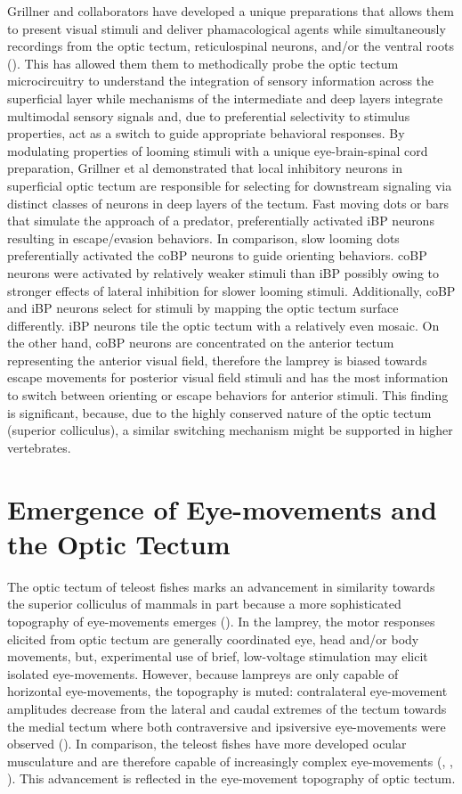 \documentclass{ar-1col}
\begin{document}
Grillner and collaborators have developed a unique preparations that allows them to present visual stimuli and deliver phamacological agents while simultaneously recordings from the optic tectum, reticulospinal neurons, and/or the ventral roots (\cite{kardamakis2015tectal}). This has allowed them them to methodically probe the optic tectum microcircuitry to understand the integration of sensory information across the superficial layer while mechanisms of the intermediate and deep layers integrate multimodal sensory signals and, due to preferential selectivity to stimulus properties, act as a switch to guide appropriate behavioral responses. By modulating properties of looming stimuli with a unique eye-brain-spinal cord preparation, Grillner et al demonstrated that local inhibitory neurons in superficial optic tectum are responsible for selecting for downstream signaling via distinct classes of neurons in deep layers of the tectum. Fast moving dots or bars that simulate the approach of a predator, preferentially activated iBP neurons resulting in escape/evasion behaviors. In comparison, slow looming dots preferentially activated the coBP neurons to guide orienting behaviors. coBP neurons were activated by relatively weaker stimuli than iBP possibly owing to stronger effects of lateral inhibition for slower looming stimuli. Additionally, coBP and iBP neurons select for stimuli by mapping the optic tectum surface differently. iBP neurons tile the optic tectum with a relatively even mosaic. On the other hand, coBP neurons are concentrated on the anterior tectum representing the anterior visual field, therefore the lamprey is biased towards escape movements for posterior visual field stimuli and has the most information to switch between orienting or escape behaviors for anterior stimuli. This finding is significant, because, due to the highly conserved nature of the optic tectum (superior colliculus), a similar switching mechanism might be supported in higher vertebrates.

\section{Emergence of Eye-movements and the Optic Tectum}
The optic tectum of teleost fishes marks an advancement in similarity towards the superior colliculus of mammals in part because a more sophisticated topography of eye-movements emerges (\cite{land2015eye}). In the lamprey, the motor responses elicited from optic tectum are generally coordinated eye, head and/or body movements, but, experimental use of brief, low-voltage stimulation may elicit isolated eye-movements. However, because lampreys are only capable of horizontal eye-movements, the topography is muted: contralateral eye-movement amplitudes decrease from the lateral and caudal extremes of the tectum towards the medial tectum where both contraversive and ipsiversive eye-movements were observed (\cite{saitoh2007tectal}). In comparison, the teleost fishes have more developed ocular musculature and are therefore capable of increasingly complex eye-movements (\cite{graf1978eye}, \cite{torres1992afferents}, \cite{northmore2011optic}). This advancement is reflected in the eye-movement topography of optic tectum.  
\end{document}
